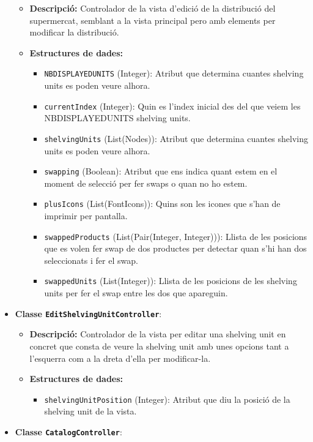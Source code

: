 \documentclass[a4paper,12pt]{report}
\begin{document}
\begin{itemize}
	\begin{itemize}
		\item \textbf{Descripció:} Controlador de la vista d'edició de la distribució del supermercat, semblant a la vista principal pero amb elements per modificar la distribució.
		\item \textbf{Estructures de dades:}
		\begin{itemize}
			\item \texttt{NBDISPLAYEDUNITS} (Integer): Atribut que determina cuantes shelving units es poden veure alhora.
			\item \texttt{currentIndex} (Integer): Quin es l'index inicial des del que veiem les NBDISPLAYEDUNITS shelving units.
			\item \texttt{shelvingUnits} (List(Nodes)): Atribut que determina cuantes shelving units es poden veure alhora.
			\item \texttt{swapping} (Boolean): Atribut que ens indica quant estem en el moment de selecció per fer swaps o quan no ho estem.
			\item \texttt{plusIcons} (List(FontIcons)): Quins son les icones que s'han de imprimir per pantalla.
			\item \texttt{swappedProducts} (List(Pair(Integer, Integer))): Llista de les posicions que es volen fer swap de dos productes per detectar quan s'hi han dos seleccionats i fer el swap.
			\item \texttt{swappedUnits} (List(Integer)): Llista de les posicions de les shelving units per fer el swap entre les dos que apareguin.
		\end{itemize}
	\end{itemize}
	\item \textbf{Classe \texttt{EditShelvingUnitController}}:
	\begin{itemize}
		\item \textbf{Descripció:} Controlador de la vista per editar una shelving unit en concret que consta de veure la shelving unit amb unes opcions tant a l'esquerra com a la dreta d'ella per modificar-la.
		\item \textbf{Estructures de dades:}
		\begin{itemize}
			\item \texttt{shelvingUnitPosition} (Integer): Atribut que diu la posició de la shelving unit de la vista.
		\end{itemize}
	\end{itemize}
	\item \textbf{Classe \texttt{CatalogController}}:

\end{itemize}
\end{document}
